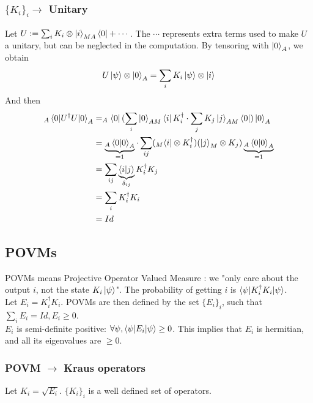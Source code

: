 \documentclass{article}
\begin{document}
\subsubsection*{$\{K_i\}_i \rightarrow$ Unitary}
Let $U := \sum_i K_i \otimes \ket{i}_{MA}\bra{0} + \cdots $.
The $\cdots$ represents extra terms used to make $U$ a unitary, but can be neglected in the computation.
By tensoring with $\ket{0}_A$, we obtain
\begin{equation}
    U\ket{\psi}\otimes \ket{0}_A = \sum_i K_i \ket{\psi}\otimes\ket{i}
\end{equation}
And then
\begin{equation}
    \begin{aligned}
        _A\braket{0 |U^\dagger U|0}_A
            & = _A\bra{0}(\sum_i\ket{0}_{AM}\bra{i} K_i^\dagger \cdot \sum_j K_j\ket{j}_{AM}\bra{0})\ket{0}_A \\
            & = \underbrace{_A\braket{0|0}_A}_{=1} \cdot \sum_{ij}(_M\bra{i}\otimes K_i^\dagger)(\ket{j}_M\otimes K_j) \underbrace{_A\braket{0|0}_A}_{=1} \\
            & = \sum_{ij}\underbrace{\braket{i|j}}_{\delta_{ij}} K_i^\dagger K_j \\
            & = \sum_i K_i^\dagger K_i \\
            & = Id
    \end{aligned}
\end{equation}
\subsection{POVMs}
POVMs means Projective Operator Valued Measure : we "only care about the output $i$, not the state $K_i\ket{\psi}$".
The probability of getting $i$ is $\braket{\psi | K_i^\dagger K_i | \psi}$.\\
Let $E_i = K_i^\dagger K_i$.
POVMs are then defined by the set $\{E_i\}_i$, such that $\sum_i E_i = Id, E_i\geq 0$.\\

$E_i$ is semi-definite positive: $ \forall \psi, \braket{\psi|E_i|\psi} \geq 0$. This implies that $E_i$ is hermitian, and all its eigenvalues are $\geq 0$.
\subsubsection*{POVM $\rightarrow$ Kraus operators}
Let $K_i = \sqrt{E_i}$. $\{K_i\}_i$ is a well defined set of operators.
\end{document}
